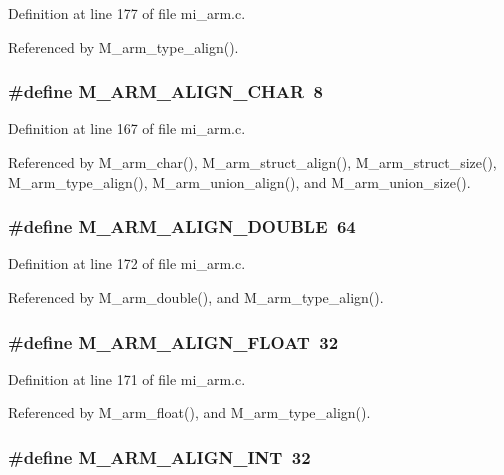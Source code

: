 Definition at line 177 of file mi\_\-arm.c.

Referenced by M\_\-arm\_\-type\_\-align().
\subsubsection{\setlength{\rightskip}{0pt plus 5cm}\#define M\_\-ARM\_\-ALIGN\_\-CHAR~8}\label{mi__arm_8c_400b5639a5f26bba9414552639cdd30a}




Definition at line 167 of file mi\_\-arm.c.

Referenced by M\_\-arm\_\-char(), M\_\-arm\_\-struct\_\-align(), M\_\-arm\_\-struct\_\-size(), M\_\-arm\_\-type\_\-align(), M\_\-arm\_\-union\_\-align(), and M\_\-arm\_\-union\_\-size().
\subsubsection{\setlength{\rightskip}{0pt plus 5cm}\#define M\_\-ARM\_\-ALIGN\_\-DOUBLE~64}\label{mi__arm_8c_5c721a25a89ad5eb2302f90f8733c945}




Definition at line 172 of file mi\_\-arm.c.

Referenced by M\_\-arm\_\-double(), and M\_\-arm\_\-type\_\-align().
\subsubsection{\setlength{\rightskip}{0pt plus 5cm}\#define M\_\-ARM\_\-ALIGN\_\-FLOAT~32}\label{mi__arm_8c_2830f0802c159709c87d9f6a28341402}




Definition at line 171 of file mi\_\-arm.c.

Referenced by M\_\-arm\_\-float(), and M\_\-arm\_\-type\_\-align().
\subsubsection{\setlength{\rightskip}{0pt plus 5cm}\#define M\_\-ARM\_\-ALIGN\_\-INT~32}\label{mi__arm_8c_1f7820e35604eb245b840d2ddde8d72b}




